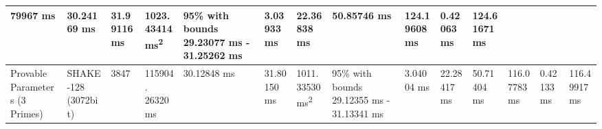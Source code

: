 \documentclass[]{final_report}
\theoremstyle{definition}
\begin{document}
\begin{landscape}
\begin{longtable}{|p{2.3cm}|p{1.8cm}|p{1.0cm}|p{1.7cm}|p{1.2cm}|p{1.5cm}|p{1.8cm}|p{1.5cm}|p{1.2cm}|p{1.5cm}|p{1.3cm}|p{1.4cm}|p{1.3cm}|p{1.5cm}|}
79967 ms & 30.24169 ms & 31.99116 ms & 1023.43414 ms\textsuperscript{2} & 95\% with bounds 29.23077 ms - 31.25262 ms & 3.03933 ms & 22.36838 ms & 50.85746 ms & 124.19608 ms & 0.42063 ms & 124.61671 ms \\
\hline
Provable Parameters (3 Primes) & SHAKE-128 (3072bit) & 3847 & 115904.
26320 ms & 30.12848 ms & 31.80150 ms & 1011.33530 ms\textsuperscript{2} & 95\% with bounds 29.12355 ms - 31.13341 ms & 3.04004 ms & 22.28417 ms & 50.71404 ms & 116.07783 ms & 0.42133 ms & 116.49917 ms \\
\hline

\end{longtable}

\end{landscape}

\end{document}

